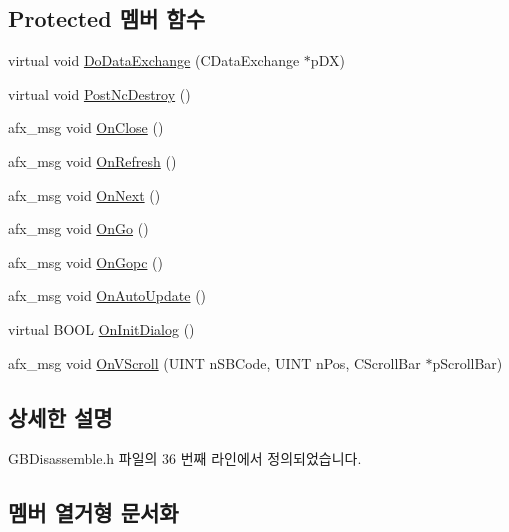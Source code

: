 \subsection*{Protected 멤버 함수}
\begin{DoxyCompactItemize}
\item 
virtual void \mbox{\hyperlink{class_g_b_disassemble_a38c5f5c6c903e54fb87b5c6eaa4afc73}{Do\+Data\+Exchange}} (C\+Data\+Exchange $\ast$p\+DX)
\item 
virtual void \mbox{\hyperlink{class_g_b_disassemble_a0302b8ddf70b5c788766fbed0e0c852e}{Post\+Nc\+Destroy}} ()
\item 
afx\+\_\+msg void \mbox{\hyperlink{class_g_b_disassemble_a2cbf8f743dec4f14119762d81f77ad60}{On\+Close}} ()
\item 
afx\+\_\+msg void \mbox{\hyperlink{class_g_b_disassemble_a44507cea06041430c59bfe5586f4914a}{On\+Refresh}} ()
\item 
afx\+\_\+msg void \mbox{\hyperlink{class_g_b_disassemble_ac818bf955fab0b2433d68ed992033169}{On\+Next}} ()
\item 
afx\+\_\+msg void \mbox{\hyperlink{class_g_b_disassemble_a567143c841e67475b78afe7aca95f520}{On\+Go}} ()
\item 
afx\+\_\+msg void \mbox{\hyperlink{class_g_b_disassemble_abd524f55b59a178d22778d9e5b80905f}{On\+Gopc}} ()
\item 
afx\+\_\+msg void \mbox{\hyperlink{class_g_b_disassemble_a5fad3e2f0c06721bd881fa0dda1001e4}{On\+Auto\+Update}} ()
\item 
virtual B\+O\+OL \mbox{\hyperlink{class_g_b_disassemble_a62b06166477944c21edeeda699fcdba5}{On\+Init\+Dialog}} ()
\item 
afx\+\_\+msg void \mbox{\hyperlink{class_g_b_disassemble_a80098655a0c93eeecc024a57ac0519ee}{On\+V\+Scroll}} (U\+I\+NT n\+S\+B\+Code, U\+I\+NT n\+Pos, C\+Scroll\+Bar $\ast$p\+Scroll\+Bar)
\end{DoxyCompactItemize}


\subsection{상세한 설명}


G\+B\+Disassemble.\+h 파일의 36 번째 라인에서 정의되었습니다.



\subsection{멤버 열거형 문서화}
\mbox{\label{class_g_b_disassemble_a7af15be4d057c5f04b6b51c5e8011416}} 
